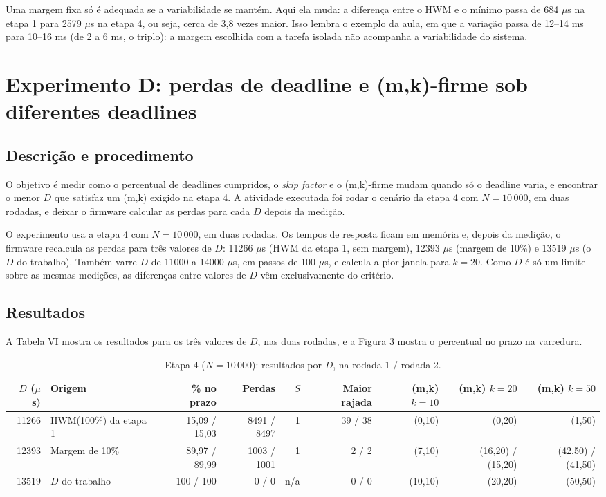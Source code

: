 \documentclass[conference,a4paper]{IEEEtran}
\begin{document}
Uma margem fixa só é adequada se a variabilidade se mantém. Aqui ela muda: a diferença entre o HWM e o mínimo passa de 684 $\mu$s na etapa 1 para 2579 $\mu$s na etapa 4, ou seja, cerca de 3,8 vezes maior. Isso lembra o exemplo da aula, em que a variação passa de 12--14 ms para 10--16 ms (de 2 a 6 ms, o triplo): a margem escolhida com a tarefa isolada não acompanha a variabilidade do sistema.

\section{Experimento D: perdas de deadline e (m,k)-firme sob diferentes deadlines}
\subsection{Descrição e procedimento}
O objetivo é medir como o percentual de deadlines cumpridos, o \emph{skip factor} e o (m,k)-firme mudam quando só o deadline varia, e encontrar o menor $D$ que satisfaz um (m,k) exigido na etapa 4. A atividade executada foi rodar o cenário da etapa 4 com $N = 10\,000$, em duas rodadas, e deixar o firmware calcular as perdas para cada $D$ depois da medição.

O experimento usa a etapa 4 com $N = 10\,000$, em duas rodadas. Os tempos de resposta ficam em memória e, depois da medição, o firmware recalcula as perdas para três valores de $D$: 11266 $\mu$s (HWM da etapa 1, sem margem), 12393 $\mu$s (margem de 10\%) e 13519 $\mu$s (o $D$ do trabalho). Também varre $D$ de 11000 a 14000 $\mu$s, em passos de 100 $\mu$s, e calcula a pior janela para $k = 20$. Como $D$ é só um limite sobre as mesmas medições, as diferenças entre valores de $D$ vêm exclusivamente do critério.

\subsection{Resultados}
A Tabela VI mostra os resultados para os três valores de $D$, nas duas rodadas, e a Figura 3 mostra o percentual no prazo na varredura.

\begin{table}[!t]
\centering
\caption{Etapa 4 ($N = 10\,000$): resultados por $D$, na rodada 1 / rodada 2.}
\small
\setlength{\tabcolsep}{4pt}
\begin{tabular}{rlrrrrrrr}
\toprule
$D$ ($\mu$s) & Origem & \% no prazo & Perdas & $S$ & Maior rajada & (m,k) $k{=}10$ & (m,k) $k{=}20$ & (m,k) $k{=}50$ \\
\midrule
11266 & HWM(100\%) da etapa 1 & 15,09 / 15,03 & 8491 / 8497 & 1 & 39 / 38 & (0,10) & (0,20) & (1,50) \\
12393 & Margem de 10\% & 89,97 / 89,99 & 1003 / 1001 & 1 & 2 / 2 & (7,10) & (16,20) / (15,20) & (42,50) / (41,50) \\
13519 & $D$ do trabalho & 100 / 100 & 0 / 0 & n/a & 0 / 0 & (10,10) & (20,20) & (50,50) \\
\bottomrule
\end{tabular}
\end{table}
\end{document}
